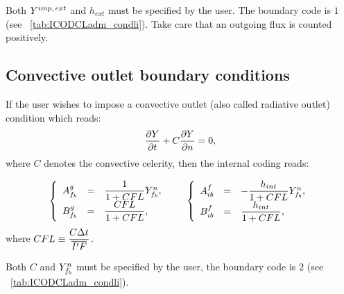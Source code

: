 \begin{remark}
Both $Y^{imp, \, ext} $ and $ h_{ext} $ must be specified by the user. The boundary code is $1$ (see \tablename~\ref{tab:ICODCLadm_condli}). Take care that an outgoing flux is counted positively.
\end{remark}

\subsection{Convective outlet boundary conditions}\label{sec:bndcnd:convective_outlet}

If the user wishes to impose a convective outlet (also called radiative outlet) condition which reads:
\begin{equation}
\dfrac{\partial  Y}{\partial  t} + C \dfrac{\partial  Y}{\partial  n} = 0,
\end{equation}
where $C$ denotes the convective celerity, then the internal coding reads:

\begin{equation}
\begin{array}{r c l}
\left\lbrace
\begin{array}{r c l}
A^g_{f_{b}} & = & \dfrac{1}{1+ CFL} Y^n_{f_{b}} ,\\
B^g_{f_{b}} & = & \dfrac{CFL}{1+ CFL},
\end{array}
\right.
& &
\left\lbrace
\begin{array}{r c l}
A^f_{ib} & = &  -  \dfrac{h_{int}}{1+ CFL} Y^n_{f_{b}},\\
B^f_{ib} & = &  \dfrac{h_{int}}{1+ CFL},
\end{array}
\right.
\end{array}
\end{equation}
where $CFL \equiv \dfrac{C \Delta t}{\overline{{I^\prime} F} }$.

\begin{remark}
Both $C$ and $Y^n_{f_{b}}$ must be specified by the user, the boundary code is $2$ (see \tablename~\ref{tab:ICODCLadm_condli}).
\end{remark}

